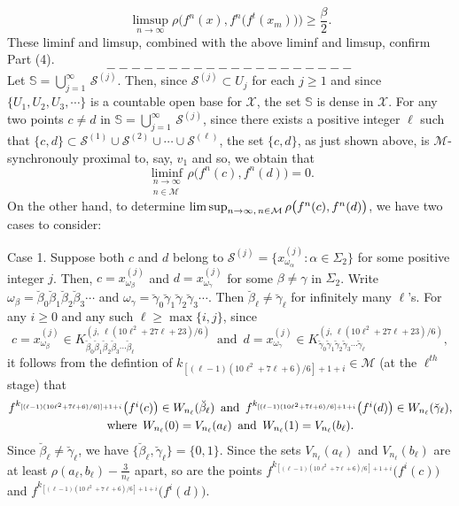 \documentclass[12pt]{article}
\newcommand{\al}{\alpha}
\newcommand{\be}{\beta}
\begin{document}
$$
\limsup_{n \to \infty} \rho\bigg(f^n(x), f^n\big(f^t(x_m)\big)\bigg) \ge \frac \beta2.
$$
\indent These liminf and limsup, combined with the above liminf and limsup, confirm Part (4).
$$--------------------$$
\indent Let $\mathbb S = \bigcup_{j=1}^\infty \, \mathcal S^{(j)}$.  Then, since $\mathcal S^{(j)} \subset U_j$ for each $j \ge 1$ and since $\{U_1, U_2, U_3, \cdots \}$ is a countable open base for $\mathcal X$, the set $\mathbb S$ is dense in $\mathcal X$.  For any two points $c \ne d$ in $\mathbb S = \bigcup_{j=1}^\infty \, \mathcal S^{(j)}$, since there exists a positive integer $\ell$ such that $\{ c, d \} \subset \mathcal S^{(1)} \cup \mathcal S^{(2)} \cup \cdots \cup \mathcal S^{(\ell)}$, the set $\{ c, d \}$, as just shown above, is $\mathcal M$-synchronouly proximal to, say, $v_1$ and so, we obtain that 
$$
\liminf_{\substack{n \to \infty \\ n \in \mathcal M}} \rho\big(f^n(c), f^n(d)\big) = 0.
$$
\indent On the other hand, to determine $\limsup_{n \to \infty, \\ \, n \in \mathcal M} \rho\big(f^n(c), f^n(d)\big)$, we have two cases to consider:

Case 1. Suppose both $c$ and $d$ belong to $\mathcal S^{(j)} = \{ x_{\omega_\al}^{(j)}: \al \in \Sigma_2 \}$ for some positive integer $j$. Then, $c = x_{\omega_{\be}}^{(j)}$ and $d = x_{\omega_{\gamma}}^{(j)}$ for some $\be \ne \gamma$ in $\Sigma_2$.  Write $\omega_{\be} = \breve \be_0 \breve \be_1 \breve \be_2 \breve \be_3 \cdots$ and $\omega_{\gamma} = \breve \gamma_0 \breve \gamma_1 \breve \gamma_2 \breve \gamma_3 \cdots$.  Then $\breve \be_\ell \ne \breve \gamma_\ell$ for infinitely many $\ell$'s.  For any $i \ge 0$ and any such $\ell \ge \max \{ i,j \}$, since 
$$
c = x_{\omega_{\be}}^{(j)} \in K_{\breve \be_0 \breve \be_1 \breve \be_2 \breve \be_3 \cdots\breve \be_\ell}^{(j, \, \ell(10\ell^2+27\ell+23)/6)} \,\,\, \text{and} \,\,\, d = x_{\omega_{\gamma}}^{(j)} \in K_{\breve \gamma_0 \breve \gamma_1 \breve \gamma_2 \breve \gamma_3 \cdots\breve \gamma_\ell}^{(j, \, \ell(10\ell^2+27\ell+23)/6)},
$$
it follows from the defintion of $k_{[(\ell-1)(10\ell^2+7\ell+6)/6]+1+i} \in \mathcal M$ (at the $\ell^{th}$ stage) that 
\begin{multline*}
$$
f^{k_{[(\ell-1)(10\ell^2+7\ell+6)/6)]+1+i}}\big(f^i(c)\big) \in W_{n_\ell}(\breve \be_\ell) \,\,\, \text{and} \,\,\, f^{k_{[(\ell-1)(10\ell^2+7\ell+6)/6]+1+i}}\big(f^i(d)\big) \in W_{n_\ell}(\breve \gamma_\ell), \\ \text{where} \,\,\, W_{n_\ell}(0) = V_{n_\ell}(a_\ell) \,\,\, \text{and} \,\,\,  W_{n_\ell}(1) = V_{n_\ell}(b_\ell).
$$
\end{multline*}
Since $\breve \be_\ell \ne \breve \gamma_\ell$, we have $\{ \breve \be_\ell, \breve \gamma_\ell \} = \{ 0, 1 \}$.  Since the sets $V_{n_\ell}(a_\ell)$ and $V_{n_\ell}(b_\ell)$ are at least $\rho(a_\ell, b_\ell) - \frac 3{n_\ell}$ apart, so are the points $f^{k_{[(\ell-1)(10\ell^2+7\ell+6)/6]+1+i}}\big(f^i(c)\big)$ and $f^{k_{[(\ell-1)(10\ell^2+7\ell+6)/6]+1+i}}\big(f^i(d)\big)$.  
\end{document}
